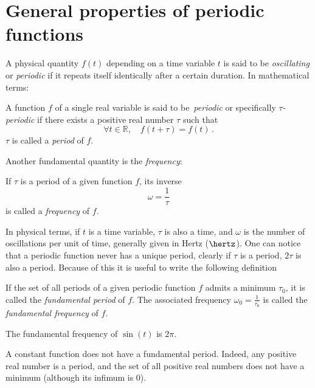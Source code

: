 \section{General properties of periodic functions}
A physical quantity $f(t)$ depending on a time variable $t$ is said to be
\emph{oscillating} or \emph{periodic} if it repeats itself identically after a certain
duration. In mathematical terms:
\begin{definition}
  A function $f$ of a single real variable is said to be~\emph{periodic} or specifically
  \emph{$\tau$-periodic} if there exists a positive real number $\tau$ such that
  \begin{equation}
    \forall t\in\mathbb{R},\quad f(t+\tau)=f(t)\,.
  \end{equation}
  $\tau$ is called a \emph{period} of $f$.
\end{definition}
Another fundamental quantity is the \emph{frequency}:
\begin{definition}
  If $\tau$ is a period of a given function $f$, its inverse
  \begin{equation}
    \omega=\frac{1}{\tau}
  \end{equation}
  is called a \emph{frequency} of $f$.
\end{definition}
In physical terms, if $t$ is a time variable, $\tau$ is also a time, and $\omega$ is the
number of oscillations per unit of time, generally given in Hertz ($\hertz$). One can
notice that a periodic function never has a unique period, \eg clearly if $\tau$ is a
period, $2\tau$ is also a period. Because of this it is useful to write the following
definition
\begin{definition}
  If the set of all periods of a given periodic function $f$ admits a minimum $\tau_0$, it
  is called the \emph{fundamental period} of $f$. The associated frequency
  $\omega_0=\frac{1}{\tau_0}$ is called the \emph{fundamental frequency} of $f$.
\end{definition}
\begin{example}
  The fundamental frequency of $\sin(t)$ is $2\pi$.
\end{example}
\begin{example}
  A constant function does not have a fundamental period. Indeed, any positive real number
  is a period, and the set of all positive real numbers does not have a minimum (although
  its infimum is $0$).
\end{example}

